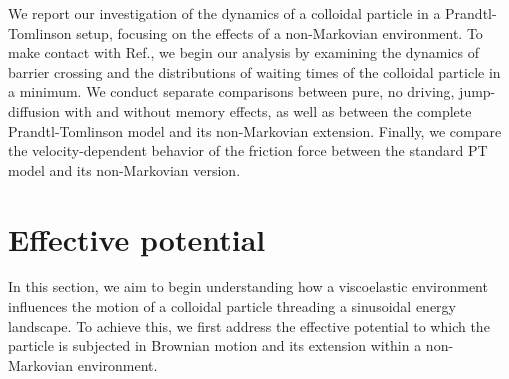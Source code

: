 We report our investigation of the dynamics of a colloidal particle in a Prandtl-Tomlinson setup, focusing on the effects of a non-Markovian environment. To make contact with Ref.\cite{ginot2022}, we begin our analysis by examining the dynamics of barrier crossing and the distributions of waiting times of the colloidal particle in a minimum. We conduct separate comparisons between pure, no driving, jump-diffusion with and without memory effects, as well as between the complete Prandtl-Tomlinson model and its non-Markovian extension. Finally, we compare the velocity-dependent behavior of the friction force between the standard PT model and its non-Markovian version.
\section{Effective potential}
In this section, we aim to begin understanding how a viscoelastic environment influences the motion of a colloidal particle threading a sinusoidal energy landscape. To achieve this, we first address the effective potential to which the particle is subjected in Brownian motion and its extension within a non-Markovian environment.


